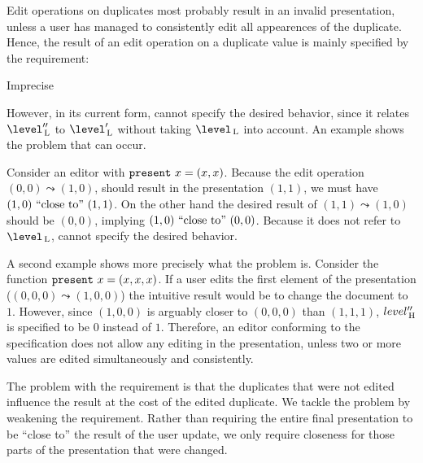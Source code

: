 Edit operations on duplicates most probably result in an invalid presentation, unless a user has managed to consistently edit all appearences of the duplicate. Hence, the result of an edit operation on a duplicate value is mainly specified by the  requirement: 


	{Imprecise}

However, in its current form,  cannot specify the desired behavior, since it relates $\level''\L$ to $\level'\L$ without taking $\level\L$ into account. An example shows the problem that can occur.

Consider an editor with ${\tt present}~x = (x,x)$. Because the edit operation $(0,0) \leadsto (1,0)$, should result in the presentation $(1,1)$, we must have $(1,0) ~\text{``close to''}~ (1,1)$. On the other hand the desired result of $(1,1) \leadsto (1,0)$ should be $(0,0)$, implying $(1,0) ~\text{``close to''}~ (0,0)$. Because it does not refer to $\level\L$,  cannot specify the desired behavior.


A second example shows more precisely what the problem is. Consider the function 
${\tt present}~x = (x,x,x)$. If a user edits the first element of the presentation
($(0,0,0) \leadsto (1,0,0)$) the intuitive result would be to change the document to $1$. However, since $(1,0,0)$ is arguably closer to $(0,0,0)$ than $(1,1,1)$, $level''_{\, \mathrm H}$ is specified to be $0$ instead of $1$. Therefore, an editor conforming to the specification does not allow any editing in the presentation, unless two or more values are edited simultaneously and consistently. 

The problem with the  requirement is that the duplicates that were not edited influence the result at the cost of the edited duplicate. We tackle the problem by weakening the  requirement. Rather than requiring the entire final presentation to be ``close to'' the result of the user update, we only require closeness for those parts of the presentation that were changed.

